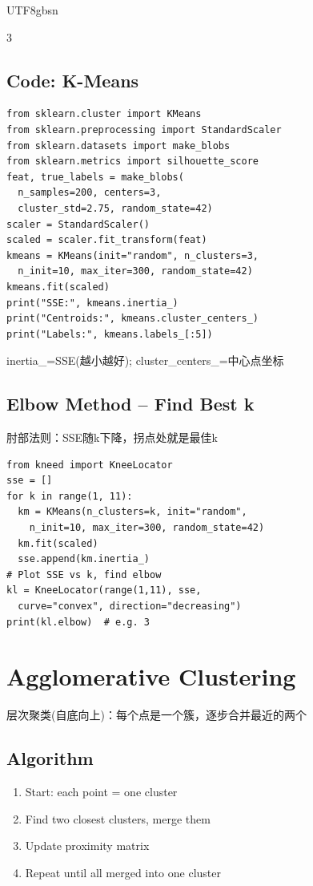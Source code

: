 \documentclass[9pt,landscape,a4paper]{article}
\newcommand{\zhint}[1]{{\scriptsize\color{gray!70!black}#1}}
\begin{document}
\begin{CJK}{UTF8}{gbsn}
\begin{multicols}{3}
\subsection{Code: K-Means}
\begin{lstlisting}
from sklearn.cluster import KMeans
from sklearn.preprocessing import StandardScaler
from sklearn.datasets import make_blobs
from sklearn.metrics import silhouette_score
feat, true_labels = make_blobs(
  n_samples=200, centers=3,
  cluster_std=2.75, random_state=42)
scaler = StandardScaler()
scaled = scaler.fit_transform(feat)
kmeans = KMeans(init="random", n_clusters=3,
  n_init=10, max_iter=300, random_state=42)
kmeans.fit(scaled)
print("SSE:", kmeans.inertia_)
print("Centroids:", kmeans.cluster_centers_)
print("Labels:", kmeans.labels_[:5])
\end{lstlisting}
\zhint{inertia\_=SSE(越小越好); cluster\_centers\_=中心点坐标}

\subsection{Elbow Method -- Find Best k}
\zhint{肘部法则：SSE随k下降，拐点处就是最佳k}
\begin{lstlisting}
from kneed import KneeLocator
sse = []
for k in range(1, 11):
  km = KMeans(n_clusters=k, init="random",
    n_init=10, max_iter=300, random_state=42)
  km.fit(scaled)
  sse.append(km.inertia_)
# Plot SSE vs k, find elbow
kl = KneeLocator(range(1,11), sse,
  curve="convex", direction="decreasing")
print(kl.elbow)  # e.g. 3
\end{lstlisting}

\section{Agglomerative Clustering}
\zhint{层次聚类(自底向上)：每个点是一个簇，逐步合并最近的两个}

\subsection{Algorithm}
\begin{enumerate}[leftmargin=10pt,itemsep=0pt,topsep=0pt]
\item Start: each point = one cluster
\item Find two closest clusters, merge them
\item Update proximity matrix
\item Repeat until all merged into one cluster
\end{enumerate}


\end{multicols}
\end{CJK}
\end{document}
